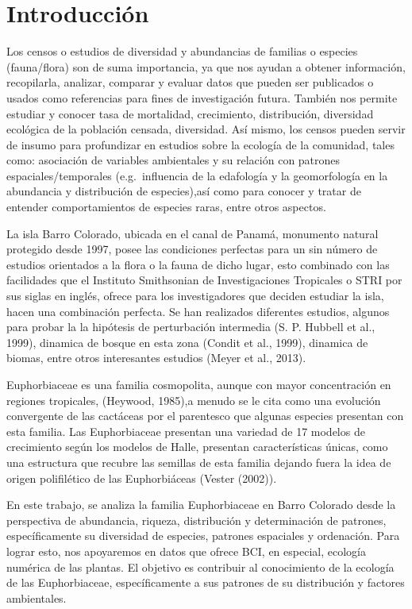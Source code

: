 \documentclass[11pt,]{article}
\begin{document}
\vskip 6.5pt


\noindent  \section{Introducción}\label{introducciuxf3n}

Los censos o estudios de diversidad y abundancias de familias o especies
(fauna/flora) son de suma importancia, ya que nos ayudan a obtener
información, recopilarla, analizar, comparar y evaluar datos que pueden
ser publicados o usados como referencias para fines de investigación
futura. También nos permite estudiar y conocer tasa de mortalidad,
crecimiento, distribución, diversidad ecológica de la población censada,
diversidad. Así mismo, los censos pueden servir de insumo para
profundizar en estudios sobre la ecología de la comunidad, tales como:
asociación de variables ambientales y su relación con patrones
espaciales/temporales (e.g.~influencia de la edafología y la
geomorfología en la abundancia y distribución de especies),así como para
conocer y tratar de entender comportamientos de especies raras, entre
otros aspectos.

La isla Barro Colorado, ubicada en el canal de Panamá, monumento natural
protegido desde 1997, posee las condiciones perfectas para un sin número
de estudios orientados a la flora o la fauna de dicho lugar, esto
combinado con las facilidades que el Instituto Smithsonian de
Investigaciones Tropicales o STRI por sus siglas en inglés, ofrece para
los investigadores que deciden estudiar la isla, hacen una combinación
perfecta. Se han realizados diferentes estudios, algunos para probar la
la hipótesis de perturbación intermedia (S. P. Hubbell et al., 1999),
dinamica de bosque en esta zona (Condit et al., 1999), dinamica de
biomas, entre otros interesantes estudios (Meyer et al., 2013).

Euphorbiaceae es una familia cosmopolita, aunque con mayor concentración
en regiones tropicales, (Heywood, 1985),a menudo se le cita como una
evolución convergente de las cactáceas por el parentesco que algunas
especies presentan con esta familia. Las Euphorbiaceae presentan una
variedad de 17 modelos de crecimiento según los modelos de Halle,
presentan características únicas, como una estructura que recubre las
semillas de esta familia dejando fuera la idea de origen polifilético de
las Euphorbiáceas (Vester (2002)).

En este trabajo, se analiza la familia Euphorbiaceae en Barro Colorado
desde la perspectiva de abundancia, riqueza, distribución y
determinación de patrones, específicamente su diversidad de especies,
patrones espaciales y ordenación. Para lograr esto, nos apoyaremos en
datos que ofrece BCI, en especial, ecología numérica de las plantas. El
objetivo es contribuir al conocimiento de la ecología de las
Euphorbiaceae, específicamente a sus patrones de su distribución y
factores ambientales.
\end{document}
